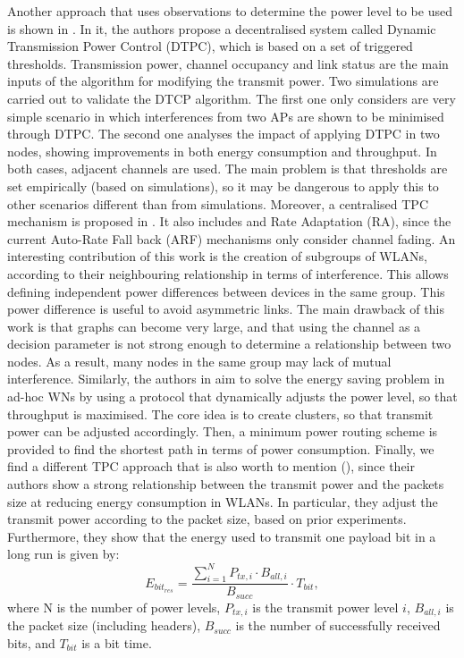 \documentclass[12pt, a4paper,twoside]{tesi_upf}
\begin{document}
				Another approach that uses observations to determine the power level to be used is shown in \cite{gandarillas2014dynamic}. In it, the authors propose a decentralised system called Dynamic Transmission Power Control (DTPC), which is based on a set of triggered thresholds. Transmission power, channel occupancy and link status are the main inputs of the algorithm for modifying the transmit power. Two simulations are carried out to validate the DTCP algorithm. The first one only considers are very simple scenario in which interferences from two APs are shown to be minimised through DTPC. The second one analyses the impact of applying DTPC in two nodes, showing improvements in both energy consumption and throughput. In both cases, adjacent channels are used. The main problem is that thresholds are set empirically (based on simulations), so it may be dangerous to apply this to other scenarios different than from simulations.	Moreover, a centralised TPC mechanism is proposed in \cite{tang2014joint}. It also includes and Rate Adaptation (RA), since the current Auto-Rate Fall back (ARF) mechanisms only consider channel fading. An interesting contribution of this work is the creation of subgroups of WLANs, according to their neighbouring relationship in terms of interference. This allows defining independent power differences between devices in the same group. This power difference is useful to avoid asymmetric links. The main drawback of this work is that graphs can become very large, and that using the channel as a decision parameter is not strong enough to determine a relationship between two nodes. As a result, many nodes in the same group may lack of mutual interference. Similarly, the authors in \cite{elbatt2000power} aim to solve the energy saving problem in ad-hoc WNs by using a protocol that dynamically adjusts the power level, so that throughput is maximised. The core idea is to create clusters, so that transmit power can be adjusted accordingly. Then, a minimum power routing scheme is provided to find the shortest path in terms of power consumption. Finally, we find a different TPC approach that is also worth to mention (\cite{ebert2000energy}), since their authors show a strong relationship between the transmit power and the packets size at reducing energy consumption in WLANs. In particular, they adjust the transmit power according to the packet size, based on prior experiments. Furthermore, they show that the energy used to transmit one payload bit in a long run is given by:
				\begin{equation}
				E_{bit_{res}} = \frac{\sum_{i=1}^N P_{tx,i} \cdot B_{all,i}}{B_{succ}} \cdot T_{bit},
				\nonumber
				\end{equation}
				where N is the number of power levels, $P_{tx,i}$ is the transmit power level $i$, $B_{all,i}$ is the packet size (including headers), $B_{succ}$ is the number of successfully received bits, and $T_{bit}$ is a bit time. 
				
\end{document}
